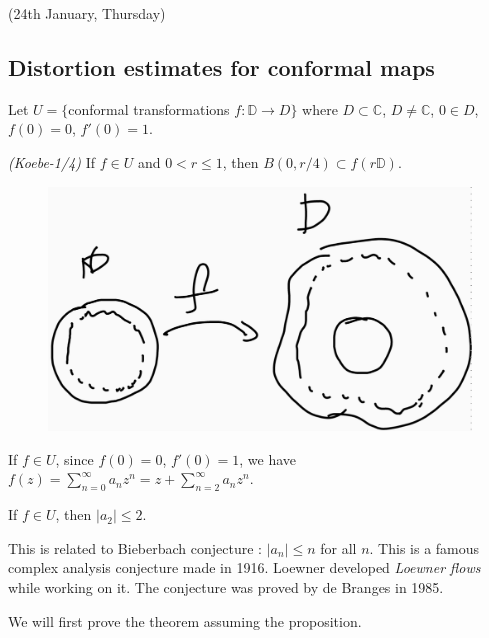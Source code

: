 \documentclass[12pt,a4paper]{article}
\begin{document}
\newday

(24th January, Thursday)
\s

\subsection*{Distortion estimates for conformal maps}

Let $U = \{$conformal transformations $f: \mathbb{D} \rightarrow D \}$ where $D\subset \mathbb{C}$, $D\neq \mathbb{C}$, $0\in D$, $f(0)=0$, $f'(0)=1$.
\s

\thm \emph{(Koebe-1/4)} If $f\in U$ and $0<r\leq 1$, then $B(0, r/4)\subset f(r\mathbb{D})$.

\begin{figure}[h]
\begin{center}
    \includegraphics[scale =0.15]{3}
\end{center}
\end{figure}
\s

If $f\in U$, since $f(0) =0$, $f'(0)=1$, we have $f(z) = \sum_{n=0}^{\infty} a_n z^n = z+ \sum_{n=2}^{\infty} a_n z^n$.
\s

 If $f\in U$, then $|a_2|\leq 2$.
\s

This is related to Bieberbach conjecture : $|a_n|\leq n$ for all $n$. This is a famous complex analysis conjecture made in 1916. Loewner developed \emph{Loewner flows} while working on it. The conjecture was proved by de Branges in 1985.
\s

We will first prove the theorem assuming the proposition.
\end{document}
